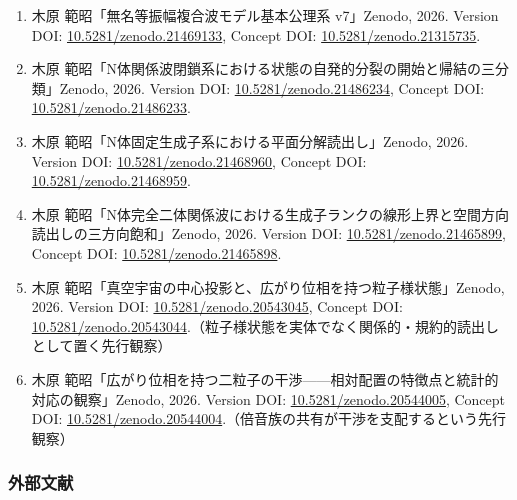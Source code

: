 \documentclass[
  a4paper,
]{ltjsarticle}
\providecommand{\tightlist}{%
  \setlength{\itemsep}{0pt}\setlength{\parskip}{0pt}}
\begin{document}
\begin{enumerate}
\def\labelenumi{\arabic{enumi}.}
\tightlist
\item
  木原 範昭「無名等振幅複合波モデル基本公理系 v7」Zenodo, 2026. Version
  DOI:
  \href{https://doi.org/10.5281/zenodo.21469133}{10.5281/zenodo.21469133},
  Concept DOI:
  \href{https://doi.org/10.5281/zenodo.21315735}{10.5281/zenodo.21315735}.
\item
  木原
  範昭「N体関係波閉鎖系における状態の自発的分裂の開始と帰結の三分類」Zenodo,
  2026. Version DOI:
  \href{https://doi.org/10.5281/zenodo.21486234}{10.5281/zenodo.21486234},
  Concept DOI:
  \href{https://doi.org/10.5281/zenodo.21486233}{10.5281/zenodo.21486233}.
\item
  木原 範昭「N体固定生成子系における平面分解読出し」Zenodo, 2026.
  Version DOI:
  \href{https://doi.org/10.5281/zenodo.21468960}{10.5281/zenodo.21468960},
  Concept DOI:
  \href{https://doi.org/10.5281/zenodo.21468959}{10.5281/zenodo.21468959}.
\item
  木原
  範昭「N体完全二体関係波における生成子ランクの線形上界と空間方向読出しの三方向飽和」Zenodo,
  2026. Version DOI:
  \href{https://doi.org/10.5281/zenodo.21465899}{10.5281/zenodo.21465899},
  Concept DOI:
  \href{https://doi.org/10.5281/zenodo.21465898}{10.5281/zenodo.21465898}.
\item
  木原 範昭「真空宇宙の中心投影と、広がり位相を持つ粒子様状態」Zenodo,
  2026. Version DOI:
  \href{https://doi.org/10.5281/zenodo.20543045}{10.5281/zenodo.20543045},
  Concept DOI:
  \href{https://doi.org/10.5281/zenodo.20543044}{10.5281/zenodo.20543044}.（粒子様状態を実体でなく関係的・規約的読出しとして置く先行観察）
\item
  木原
  範昭「広がり位相を持つ二粒子の干渉------相対配置の特徴点と統計的対応の観察」Zenodo,
  2026. Version DOI:
  \href{https://doi.org/10.5281/zenodo.20544005}{10.5281/zenodo.20544005},
  Concept DOI:
  \href{https://doi.org/10.5281/zenodo.20544004}{10.5281/zenodo.20544004}.（倍音族の共有が干渉を支配するという先行観察）
\end{enumerate}

\subsubsection{外部文献}\label{ux5916ux90e8ux6587ux732e}
\end{document}
